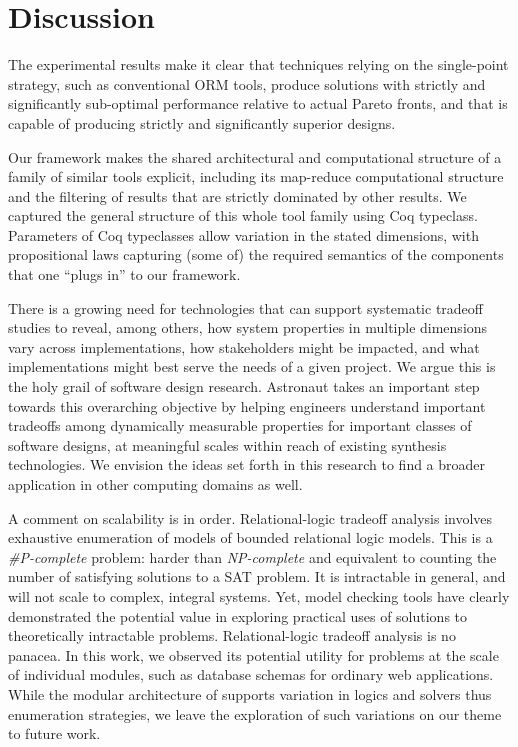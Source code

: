\documentclass{sig-alternate}
\begin{document}
 
 
\section{Discussion}
\label{discussion}

The experimental results make it clear that techniques relying on the single-point strategy, such as conventional ORM tools, produce solutions with strictly and significantly sub-optimal performance relative to actual Pareto fronts, and that \@approach  is capable of producing strictly and significantly superior designs.

Our framework makes the shared architectural and computational structure of a family of similar tools explicit, including its map-reduce computational structure and the filtering of results that are strictly dominated by other results. We captured the general structure of this whole tool family using Coq typeclass. Parameters of Coq typeclasses allow variation in the stated dimensions, with propositional laws capturing (some of) the required semantics of the components that one ``plugs in'' to our framework.

There is a growing need for technologies that can support systematic tradeoff studies to reveal, among others, how system properties in multiple dimensions vary across implementations, how stakeholders might be impacted, and what implementations might best serve the needs of a given project. We argue this is the holy grail of software design research. Astronaut takes an important step towards this overarching objective by helping engineers understand important tradeoffs among dynamically measurable properties for important classes of software designs, at meaningful scales within reach of existing synthesis technologies. We envision the ideas set forth in this research to find a broader application in other computing domains as well.


A comment on scalability is in order. Relational-logic tradeoff analysis involves exhaustive enumeration of models of bounded relational logic models. This is a {\em \#P-complete} problem: harder than {\em NP-complete} and equivalent to counting the number of satisfying solutions to a SAT problem. It is intractable in general, and will not scale to complex, integral systems. Yet, model checking tools have clearly demonstrated the potential value in exploring practical uses of solutions to theoretically intractable problems. Relational-logic tradeoff analysis is no panacea.  In this work, we observed its potential utility for problems at the scale of individual modules, such as database schemas for ordinary web applications. While the modular architecture of \@approach supports variation in logics and solvers thus enumeration strategies, we leave the exploration of such variations on our theme to future work. 
\end{document}
